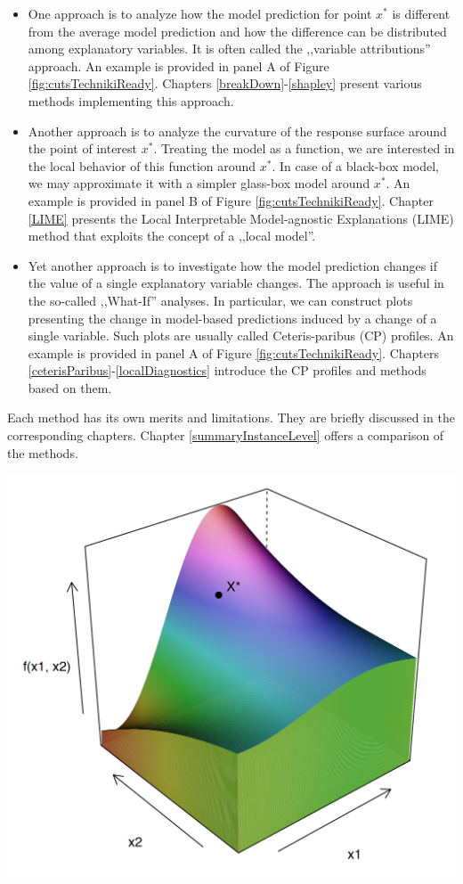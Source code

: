 \documentclass[12pt,]{krantz}
\providecommand{\tightlist}{%
  \setlength{\itemsep}{0pt}\setlength{\parskip}{0pt}}
\begin{document}
\begin{itemize}
\tightlist
\item
  One approach is to analyze how the model prediction for point \(x^*\) is different from the average model prediction and how the difference can be distributed among explanatory variables. It is often called the ,,variable attributions'' approach. An example is provided in panel A of Figure \ref{fig:cutsTechnikiReady}. Chapters \ref{breakDown}-\ref{shapley} present various methods implementing this approach.
\item
  Another approach is to analyze the curvature of the response surface around the point of interest \(x^*\). Treating the model as a function, we are interested in the local behavior of this function around \(x^*\). In case of a black-box model, we may approximate it with a simpler glass-box model around \(x^*\). An example is provided in panel B of Figure \ref{fig:cutsTechnikiReady}. Chapter \ref{LIME} presents the Local Interpretable Model-agnostic Explanations (LIME) method that exploits the concept of a ,,local model''.
\item
  Yet another approach is to investigate how the model prediction changes if the value of a single explanatory variable changes. The approach is useful in the so-called ,,What-If'' analyses. In particular, we can construct plots presenting the change in model-based predictions induced by a change of a single variable. Such plots are usually called Ceteris-paribus (CP) profiles. An example is provided in panel A of Figure \ref{fig:cutsTechnikiReady}. Chapters \ref{ceterisParibus}-\ref{localDiagnostics} introduce the CP profiles and methods based on them.
\end{itemize}

Each method has its own merits and limitations. They are briefly discussed in the corresponding chapters. Chapter \ref{summaryInstanceLevel} offers a comparison of the methods.

\begin{center}\includegraphics[width=0.6\linewidth]{figure/cuts_surface_ready_punkt} \end{center}
\end{document}
